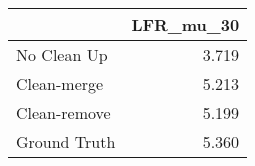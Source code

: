 \begin{tabular}{lr}
\toprule
{} & LFR_mu_30 \\
\midrule
No Clean Up  &     3.719 \\
Clean-merge  &     5.213 \\
Clean-remove &     5.199 \\
Ground Truth &     5.360 \\
\bottomrule
\end{tabular}
